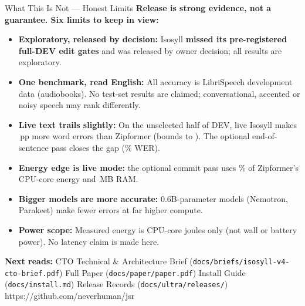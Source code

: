 \documentclass[letterpaper]{article}
\begin{document}
\begin{minipage}[t]{0.495\textwidth}
  \vspace{0pt}
  \begin{govbox}{What This Is Not --- Honest Limits}
    \textbf{Release \releasever{} is strong evidence, not a guarantee. Six limits to keep in view:}
    \begin{itemize}[leftmargin=1.10em,itemsep=1.5pt,topsep=2pt]
      \item \textbf{Exploratory, released by decision:} Isosyll \releasever{} \textbf{missed its pre-registered full-DEV edit gates} and was released by owner decision; all results are exploratory.
      \item \textbf{One benchmark, read English:} All accuracy is LibriSpeech development data (audiobooks). No test-set results are claimed; conversational, accented or noisy speech may rank differently.
      \item \textbf{Live text trails slightly:} On the unselected half of DEV, live Isosyll makes \CandLiveLmCDelta\,pp more word errors than Zipformer (bounds \CandLiveLmCLo{} to \CandLiveLmCHi). The optional end-of-sentence pass closes the gap (\ColdRcTwoFinalWer\% WER).
      \item \textbf{Energy edge is live mode:} the optional commit pass uses \VsEnergyPctTwo\% of Zipformer's CPU-core energy and \ColdRcTwoFinalRss\,MB RAM.
      \item \textbf{Bigger models are more accurate:} 0.6B-parameter models (Nemotron, Parakeet) make fewer errors at far higher compute.
      \item \textbf{Power scope:} Measured energy is CPU-core joules only (not wall or battery power). No latency claim is made here.
    \end{itemize}
  \end{govbox}
\end{minipage}

%
  {\textbf{Next reads:} CTO Technical \& Architecture Brief (\texttt{docs/briefs/isosyll-v4-cto-brief.pdf}) \;\textbar\; Full Paper (\texttt{docs/paper/paper.pdf}) \;\textbar\; Install Guide (\texttt{docs/install.md}) \;\textbar\; Release Records (\texttt{docs/ultra/releases/})}%
  {https://github.com/neverhuman/jsr}
\end{document}
